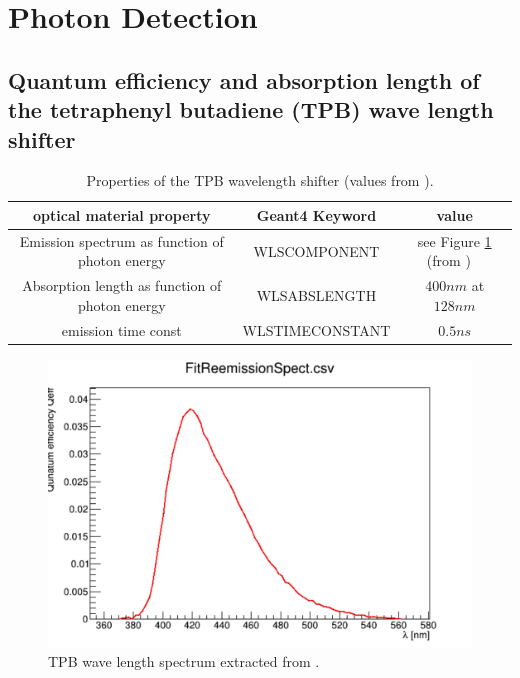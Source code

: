 \documentclass{article}
\begin{document}
  
  \clearpage
  \section{Photon Detection}
\subsection{Quantum efficiency and absorption length of the tetraphenyl butadiene (TPB) wave length shifter}

\begin{table}[h!]
  \begin{center}
    \label{tab:wls}
    \begin{tabular}{|c|c|c|} 
      \hline
      \textbf{optical material property} &\textbf{ Geant4 Keyword} & \textbf{value}\\
      \hline
      Emission spectrum as function of photon energy & WLSCOMPONENT & see Figure \ref{fig:wls} (from  \cite{ref:wls}) \ \\
      Absorption length as function of photon energy & WLSABSLENGTH & $400 nm$ at $128 nm$ \\
      emission time const                           &  WLSTIMECONSTANT        & $0.5 ns$  \\
      \hline
    \end{tabular}
  \end{center}
  \caption{Properties of the TPB wavelength shifter (values from \cite{ref:wls}).}
 \end{table}


\begin{figure}[ht]
\begin{center}
\includegraphics[width=35.5pc]{wls.pdf}
\end{center}
\caption{\label{fig:wls} TPB wave length spectrum extracted from \cite{ref:wls}.}
\end{figure}
\end{document}
